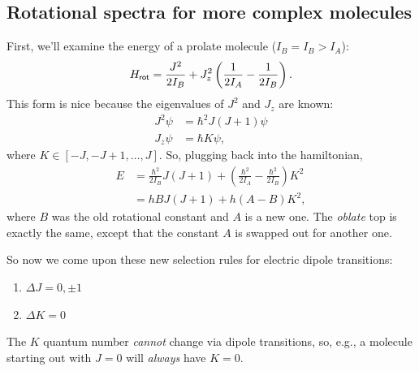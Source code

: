 \documentclass{tufte-handout}
\renewcommand{\rm}{\sf}
\begin{document}
\subsection{Rotational spectra for more complex molecules}
First, we'll examine the energy of a prolate molecule ($I_B = I_B > I_A$):
\begin{equation}
H_{\rm rot} = \frac{J^2}{2I_B} + J_z^2 \left (\frac{1}{2I_A} - \frac{1}{2I_B}\right ).
\end{equation}
This form is nice because the eigenvalues of $J^2$ and $J_z$ are known:
\begin{align}
J^2 \psi &= \hbar^2 J(J+1) \psi\\
J_z \psi &= \hbar K \psi,
\end{align}
where $K \in [-J, -J+1, \ldots, J] $. So, plugging back into the hamiltonian,
\begin{align}
E &= \frac{\hbar^2}{2I_B}J(J+1) + \left (\frac{\hbar^2}{2I_A} - \frac{\hbar^2}{2I_B}\right )K^2\\
&= hBJ(J+1) + h(A-B) K^2,
\end{align}
where $B$ was the old rotational constant and $A$ is a new one. The \textit{oblate} top is exactly the same, except that the constant $A$ is swapped out for another one.

So now we come upon these new selection rules for electric dipole transitions:
\begin{enumerate}
\item $\Delta J = 0, \pm 1$
\item $\Delta K = 0$
\end{enumerate}
The $K$ quantum number \textit{cannot} change via dipole transitions, so, e.g., a molecule starting out with $J=0$ will \textit{always} have $K=0$.
\end{document}
